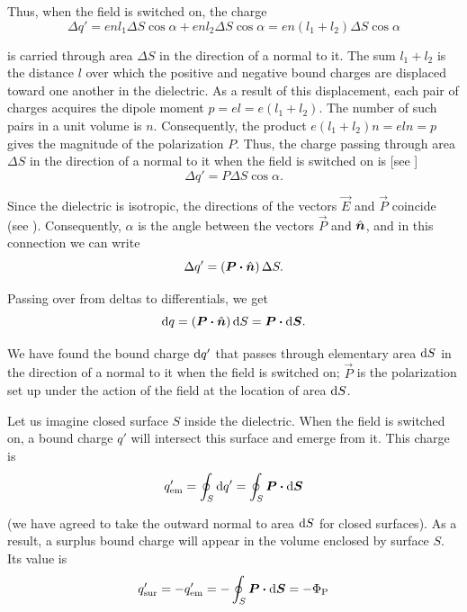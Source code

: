 Thus, when the field is switched on, the charge
\begin{equation*}
    \Delta{q}' = enl_1\Delta{S}\cos\alpha + enl_2\Delta{S}\cos\alpha = en (l_1+l_2) \Delta{S} \cos\alpha
\end{equation*}

\noindent
is carried through area $\Delta{S}$ in the direction of a normal to it. The sum $l_1+l_2$ is the distance $l$ over which the positive and negative bound charges are  displaced toward one another in the dielectric. As a result of this displacement, each pair of charges acquires the dipole moment $p=el=e(l_1+l_2)$. The number of such pairs in a unit volume is $n$. Consequently, the product $e(l_1+l_2)n=eln=p$ gives the magnitude of the polarization $P$. Thus, the charge passing through area $\Delta{S}$ in the direction of a normal to it when the field is switched on is [see ]
\begin{equation*}
    \Delta{q}' = P \Delta{S} \cos\alpha.
\end{equation*}

Since the dielectric is isotropic, the directions of the vectors $\vec{E}$ and $\vec{P}$ coincide (see ). Consequently, $\alpha$ is the angle between the vectors $\vec{P}$ and $\hat{\boldsymbol{n}}$, and in this connection we can write
\begin{equation*}
    \Delta{q}' = (\boldsymbol{P} \boldsymbol{\cdot} \hat{\boldsymbol{n}})\, \Delta{S}.
\end{equation*}

\noindent
Passing over from deltas to differentials, we get
\begin{equation*}
    \mathrm{d} q = (\boldsymbol{P} \boldsymbol{\cdot} \hat{\boldsymbol{n}})\, \mathrm{d} S = \boldsymbol{P} \boldsymbol{\cdot} \mathrm{d}\boldsymbol{S}.
\end{equation*}

We have found the bound charge $\mathrm{d} q'$ that passes through elementary area $\mathrm{d} S$ in the direction of a normal to it when the field is switched on; $\vec{P}$ is the polarization set up under the action of the field at the location of area $\mathrm{d} S$.

Let us imagine closed surface $S$ inside the dielectric. When the field is switched on, a bound charge $q'$ will intersect this surface and emerge from it. This charge is
\begin{equation*}
    q'_{\text{em}} = \oint_S \mathrm{d} q' = \oint_S \boldsymbol{P} \boldsymbol{\cdot} \mathrm{d}\boldsymbol{S}
\end{equation*}

\noindent
(we have agreed to take the outward normal to area $\mathrm{d} S$ for closed surfaces). As a result, a surplus bound charge will appear in the volume enclosed by surface $S$. Its value is
\begin{equation}\label{eq:2_11}
    q'_{\text{sur}} = - q'_{\text{em}} = - \oint_S \boldsymbol{P} \boldsymbol{\cdot} \mathrm{d}\boldsymbol{S} = - \Phi_{\text{P}}
\end{equation}

